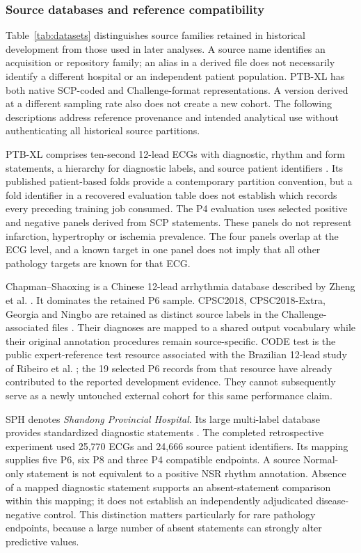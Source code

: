 \subsubsection{Source databases and reference compatibility}
\label{sec:datasets}
Table~\ref{tab:datasets} distinguishes source families retained in historical development from those used in later analyses. A source name identifies an acquisition or repository family; an alias in a derived file does not necessarily identify a different hospital or an independent patient population. PTB-XL has both native SCP-coded and Challenge-format representations. A version derived at a different sampling rate also does not create a new cohort. The following descriptions address reference provenance and intended analytical use without authenticating all historical source partitions.

PTB-XL comprises ten-second 12-lead ECGs with diagnostic, rhythm and form statements, a hierarchy for diagnostic labels, and source patient identifiers \citep{Wagner2020PTBXL}. Its published patient-based folds provide a contemporary partition convention, but a fold identifier in a recovered evaluation table does not establish which records every preceding training job consumed. The P4 evaluation uses selected positive and negative panels derived from SCP statements. These panels do not represent infarction, hypertrophy or ischemia prevalence. The four panels overlap at the ECG level, and a known target in one panel does not imply that all other pathology targets are known for that ECG.

Chapman--Shaoxing is a Chinese 12-lead arrhythmia database described by Zheng et al. \citep{Zheng2020Chapman}. It dominates the retained P6 sample. CPSC2018, CPSC2018-Extra, Georgia and Ningbo are retained as distinct source labels in the Challenge-associated files \citep{Reyna2022Challenge}. Their diagnoses are mapped to a shared output vocabulary while their original annotation procedures remain source-specific. CODE test is the public expert-reference test resource associated with the Brazilian 12-lead study of Ribeiro et al. \citep{Ribeiro2020Automatic}; the 19 selected P6 records from that resource have already contributed to the reported development evidence. They cannot subsequently serve as a newly untouched external cohort for this same performance claim.

SPH denotes \emph{Shandong Provincial Hospital}. Its large multi-label database provides standardized diagnostic statements \citep{SPH2022}. The completed retrospective experiment used 25,770 ECGs and 24,666 source patient identifiers. Its mapping supplies five P6, six P8 and three P4 compatible endpoints. A source Normal-only statement is not equivalent to a positive NSR rhythm annotation. Absence of a mapped diagnostic statement supports an absent-statement comparison within this mapping; it does not establish an independently adjudicated disease-negative control. This distinction matters particularly for rare pathology endpoints, because a large number of absent statements can strongly alter predictive values.

